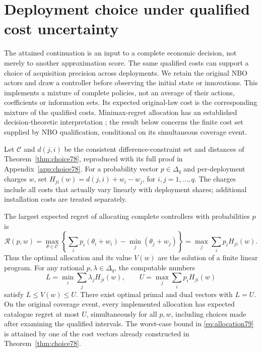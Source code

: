 \section{Deployment choice under qualified cost uncertainty}\label{sec:allocation79}
The attained continuation is an input to a complete economic decision, not merely to another approximation score. The same qualified costs can support a choice of acquisition precision across deployments. We retain the original NBO actors and draw a controller before observing the initial state or innovations. This implements a mixture of complete policies, not an average of their actions, coefficients or information sets. Its expected original-law cost is the corresponding mixture of the qualified costs. Minimax-regret allocation has an established decision-theoretic interpretation \citep{manski2004}; the result below concerns the finite cost set supplied by NBO qualification, conditional on its simultaneous coverage event.

Let $\mathcal C$ and $d(j,i)$ be the consistent difference-constraint set and distances of Theorem~\ref{thm:choice78}, reproduced with its full proof in Appendix~\ref{app:choice78}. For a probability vector $p\in\Delta_q$ and per-deployment charges $w$, set $H_{ji}(w)=d(j,i)+w_i-w_j$, for $i,j=1,\ldots,q$. The charges include all costs that actually vary linearly with deployment shares; additional installation costs are treated separately.

\begin{theorem}\label{thm:allocation79}
The largest expected regret of allocating complete controllers with probabilities $p$ is
\begin{equation}\label{eq:allocation79}
 \mathcal R(p,w)=\max_{\theta\in\mathcal C}
 \left\{\sum_i p_i(\theta_i+w_i)-\min_j(\theta_j+w_j)\right\}
 =\max_j\sum_i p_iH_{ji}(w).
\end{equation}
Thus the optimal allocation and its value $V(w)$ are the solution of a finite linear program. For any rational $p,\lambda\in\Delta_q$, the computable numbers
\[
 L=\min_i\sum_j\lambda_jH_{ji}(w),\qquad
 U=\max_j\sum_i p_iH_{ji}(w)
\]
satisfy $L\le V(w)\le U$. There exist optimal primal and dual vectors with $L=U$. On the original coverage event, every implemented allocation has expected catalogue regret at most $U$, simultaneously for all $p,w$, including choices made after examining the qualified intervals. The worst-case bound in \eqref{eq:allocation79} is attained by one of the cost vectors already constructed in Theorem~\ref{thm:choice78}.
\end{theorem}

